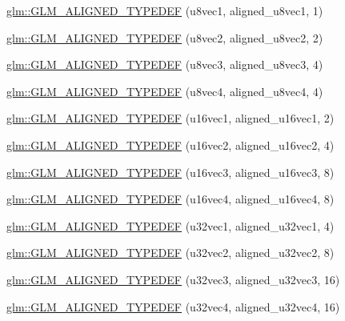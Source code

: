 \begin{DoxyCompactItemize}
\item 
\hyperlink{group__gtx__type__aligned_ga5611d6718e3a00096918a64192e73a45}{glm\-::\-G\-L\-M\-\_\-\-A\-L\-I\-G\-N\-E\-D\-\_\-\-T\-Y\-P\-E\-D\-E\-F} (u8vec1, aligned\-\_\-u8vec1, 1)
\item 
\hyperlink{group__gtx__type__aligned_ga19837e6f72b60d994a805ef564c6c326}{glm\-::\-G\-L\-M\-\_\-\-A\-L\-I\-G\-N\-E\-D\-\_\-\-T\-Y\-P\-E\-D\-E\-F} (u8vec2, aligned\-\_\-u8vec2, 2)
\item 
\hyperlink{group__gtx__type__aligned_ga9740cf8e34f068049b42a2753f9601c2}{glm\-::\-G\-L\-M\-\_\-\-A\-L\-I\-G\-N\-E\-D\-\_\-\-T\-Y\-P\-E\-D\-E\-F} (u8vec3, aligned\-\_\-u8vec3, 4)
\item 
\hyperlink{group__gtx__type__aligned_ga8b8588bb221448f5541a858903822a57}{glm\-::\-G\-L\-M\-\_\-\-A\-L\-I\-G\-N\-E\-D\-\_\-\-T\-Y\-P\-E\-D\-E\-F} (u8vec4, aligned\-\_\-u8vec4, 4)
\item 
\hyperlink{group__gtx__type__aligned_ga991abe990c16de26b2129d6bc2f4c051}{glm\-::\-G\-L\-M\-\_\-\-A\-L\-I\-G\-N\-E\-D\-\_\-\-T\-Y\-P\-E\-D\-E\-F} (u16vec1, aligned\-\_\-u16vec1, 2)
\item 
\hyperlink{group__gtx__type__aligned_gac01bb9fc32a1cd76c2b80d030f71df4c}{glm\-::\-G\-L\-M\-\_\-\-A\-L\-I\-G\-N\-E\-D\-\_\-\-T\-Y\-P\-E\-D\-E\-F} (u16vec2, aligned\-\_\-u16vec2, 4)
\item 
\hyperlink{group__gtx__type__aligned_ga09540dbca093793a36a8997e0d4bee77}{glm\-::\-G\-L\-M\-\_\-\-A\-L\-I\-G\-N\-E\-D\-\_\-\-T\-Y\-P\-E\-D\-E\-F} (u16vec3, aligned\-\_\-u16vec3, 8)
\item 
\hyperlink{group__gtx__type__aligned_gaecafb5996f5a44f57e34d29c8670741e}{glm\-::\-G\-L\-M\-\_\-\-A\-L\-I\-G\-N\-E\-D\-\_\-\-T\-Y\-P\-E\-D\-E\-F} (u16vec4, aligned\-\_\-u16vec4, 8)
\item 
\hyperlink{group__gtx__type__aligned_gac6b161a04d2f8408fe1c9d857e8daac0}{glm\-::\-G\-L\-M\-\_\-\-A\-L\-I\-G\-N\-E\-D\-\_\-\-T\-Y\-P\-E\-D\-E\-F} (u32vec1, aligned\-\_\-u32vec1, 4)
\item 
\hyperlink{group__gtx__type__aligned_ga1fa0dfc8feb0fa17dab2acd43e05342b}{glm\-::\-G\-L\-M\-\_\-\-A\-L\-I\-G\-N\-E\-D\-\_\-\-T\-Y\-P\-E\-D\-E\-F} (u32vec2, aligned\-\_\-u32vec2, 8)
\item 
\hyperlink{group__gtx__type__aligned_ga0019500abbfa9c66eff61ca75eaaed94}{glm\-::\-G\-L\-M\-\_\-\-A\-L\-I\-G\-N\-E\-D\-\_\-\-T\-Y\-P\-E\-D\-E\-F} (u32vec3, aligned\-\_\-u32vec3, 16)
\item 
\hyperlink{group__gtx__type__aligned_ga14fd29d01dae7b08a04e9facbcc18824}{glm\-::\-G\-L\-M\-\_\-\-A\-L\-I\-G\-N\-E\-D\-\_\-\-T\-Y\-P\-E\-D\-E\-F} (u32vec4, aligned\-\_\-u32vec4, 16)

\end{DoxyCompactItemize}
